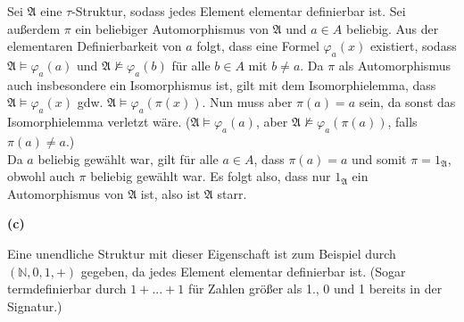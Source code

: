 \documentclass[11pt, a4paper]{article}
\newcommand{\struc}[1]{\ensuremath{\mathfrak{#1}}}
\begin{document}
\begin{adjustwidth}{20pt}{20pt}
	Sei \struc{A} eine $\tau$-Struktur, sodass jedes Element elementar definierbar ist. Sei außerdem $\pi$ ein beliebiger Automorphismus von \struc{A} und $a \in A$ beliebig.
	Aus der elementaren Definierbarkeit von $a$ folgt, dass eine Formel $\varphi_a(x)$ existiert, sodass $\struc{A} \models \varphi_a(a)$ und $\struc{A} \not\models \varphi_a(b)$
	für alle $b \in A$ mit $b \neq a$. Da $\pi$ als Automorphismus auch insbesondere ein Isomorphismus ist, gilt mit dem Isomorphielemma, dass $\struc{A} \models \varphi_a(x)$ gdw.
	$\struc{A} \models \varphi_a(\pi(x))$. Nun muss aber $\pi(a)=a$ sein, da sonst das Isomorphielemma verletzt wäre. ($\struc{A} \models \varphi_a(a)$, aber
	$\struc{A} \not\models \varphi_a(\pi(a))$, falls $\pi(a) \neq a$.) \\
	Da $a$ beliebig gewählt war, gilt für alle $a \in A$, dass $\pi(a)=a$ und somit $\pi = 1_\struc{A}$, obwohl auch $\pi$ beliebig gewählt war. Es folgt also, dass nur $1_\struc{A}$
	ein Automorphismus von \struc{A} ist, also ist \struc{A} starr.
\end{adjustwidth}
\textbf{(c)}
\begin{adjustwidth}{20pt}{20pt}
	Eine unendliche Struktur mit dieser Eigenschaft ist zum Beispiel durch $(\mathbb{N},0,1,+)$ gegeben, da jedes Element elementar definierbar ist. (Sogar termdefinierbar durch
	$1+...+1$ für Zahlen größer als 1., 0 und 1 bereits in der Signatur.)
\end{adjustwidth}
\end{document}
